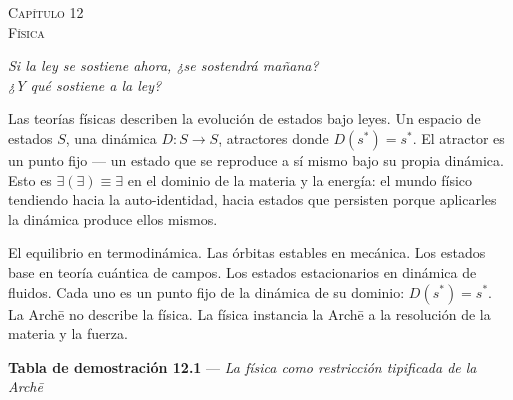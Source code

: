 \documentclass[10pt, openany, oneside]{book}
\renewcommand{\large}{\fontsize{11.5}{14}\selectfont}
\renewcommand{\huge}{\fontsize{17}{21}\selectfont}
\begin{document}
%
%
%
%

\newpage

\begin{center}
    {\huge\scshape Capítulo 12}\\[0.3em]
    {\large\scshape Física}
\end{center}

\vspace{1.5em}

\begin{center}
    \itshape
    Si la ley se sostiene ahora, ¿se sostendrá mañana?\\
    ¿Y qué sostiene a la ley?
\end{center}

\vspace{2em}


\noindent Las teorías físicas describen la evolución de estados bajo leyes. Un espacio de estados $S$, una dinámica $D: S \to S$, atractores donde $D(s^*) = s^*$. El atractor es un punto fijo --- un estado que se reproduce a sí mismo bajo su propia dinámica. Esto es $\exists(\exists) \equiv \exists$ en el dominio de la materia y la energía: el mundo físico tendiendo hacia la auto-identidad, hacia estados que persisten porque aplicarles la dinámica produce ellos mismos.

El equilibrio en termodinámica. Las órbitas estables en mecánica. Los estados base en teoría cuántica de campos. Los estados estacionarios en dinámica de fluidos. Cada uno es un punto fijo de la dinámica de su dominio: $D(s^*) = s^*$. La Arch\={e} no describe la física. La física instancia la Arch\={e} a la resolución de la materia y la fuerza.

\vspace{0.5em}

\textbf{Tabla de demostración 12.1} --- \textit{La física como restricción tipificada de la Arch\={e}}
\end{document}
